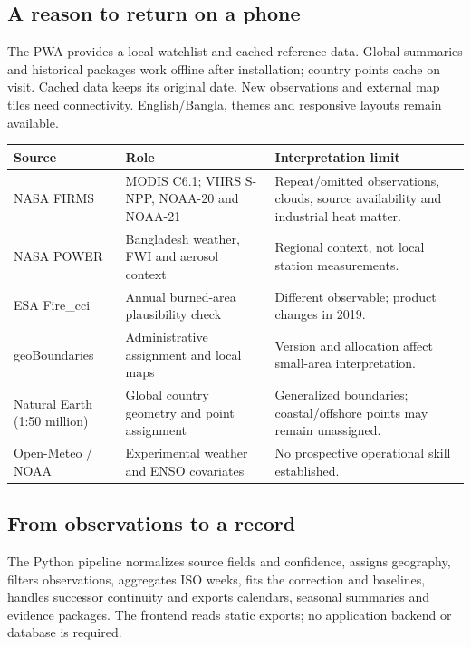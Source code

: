 \subsection{A reason to return on a phone}
The PWA provides a local watchlist and cached reference data. Global summaries and historical packages work offline after installation; country points cache on visit. Cached data keeps its original date. New observations and external map tiles need connectivity. English/Bangla, themes and responsive layouts remain available.


\begin{tabularx}{\linewidth}{@{}L{29mm}YY@{}}
\toprule\textbf{Source} & \textbf{Role} & \textbf{Interpretation limit}\\\midrule
NASA FIRMS & MODIS C6.1; VIIRS S-NPP, NOAA-20 and NOAA-21 & Repeat/omitted observations, clouds, source availability and industrial heat matter.\\
NASA POWER & Bangladesh weather, FWI and aerosol context & Regional context, not local station measurements.\\
ESA Fire\_cci & Annual burned-area plausibility check & Different observable; product changes in 2019.\\
geoBoundaries & Administrative assignment and local maps & Version and allocation affect small-area interpretation.\\
Natural Earth (1:50 million) & Global country geometry and point assignment & Generalized boundaries; coastal/offshore points may remain unassigned.\\
Open-Meteo / NOAA & Experimental weather and ENSO covariates & No prospective operational skill established.\\\bottomrule
\end{tabularx}

\subsection{From observations to a record}
The Python pipeline normalizes source fields and confidence, assigns geography, filters observations, aggregates ISO weeks, fits the correction and baselines, handles successor continuity and exports calendars, seasonal summaries and evidence packages. The frontend reads static exports; no application backend or database is required.

